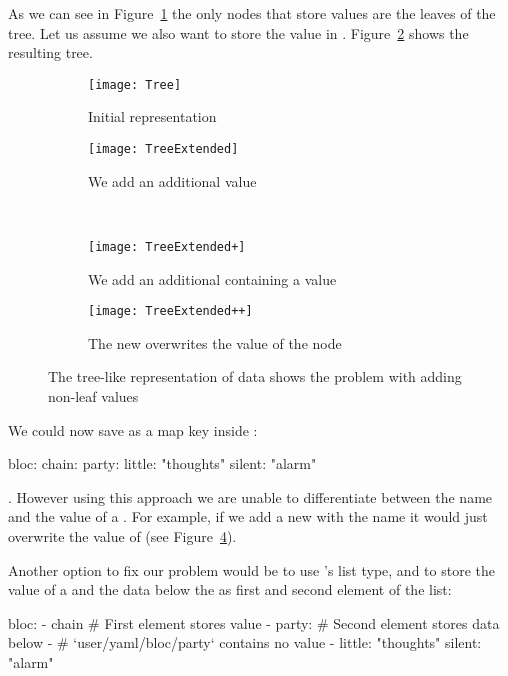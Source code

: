 As we can see in Figure~\ref{fig:tree} the only nodes that store values are the leaves of the tree. Let us assume we also want to store the value  in . Figure~\ref{fig:tree_extended} shows the resulting tree.

\begin{figure}[H]
  \centering
  \begin{subfigure}[t]{.4\textwidth}
    \centering
    \texttt{[image: Tree]}
    \caption{Initial representation}
    \label{fig:tree}
  \end{subfigure}
  \qquad
  \begin{subfigure}[t]{.4\textwidth}
    \centering
    \texttt{[image: TreeExtended]}
    \caption{We add an additional value}
    \label{fig:tree_extended}
  \end{subfigure}\\
  \begin{subfigure}[t]{.4\textwidth}
    \centering
    \texttt{[image: TreeExtended+]}
    \caption{We add an additional  containing a value}
  \end{subfigure}
  \quad
  \begin{subfigure}[t]{.4\textwidth}
    \centering
    \texttt{[image: TreeExtended++]}
    \caption{The new  overwrites the value of the node }
    \label{fig:tree_extended++}
  \end{subfigure}
  \caption{The tree-like representation of  data shows the problem with adding non-leaf values}
\end{figure}

We could now save  as a map key inside :

\begin{yamlcode}
  bloc:
    chain:
    party:
      little: "thoughts"
      silent: "alarm"
\end{yamlcode}

. However using this approach we are unable to differentiate between the name and the value of a . For example, if we add a new  with the name  it would just overwrite the value of  (see Figure~\ref{fig:tree_extended++}).

Another option to fix our problem would be to use ’s list type, and to store the value of a  and the data below the  as first and second element of the list:

\begin{yamlcode}
  bloc:
    - chain                 # First element stores value
    - party:                # Second element stores data below
      -                     # `user/yaml/bloc/party` contains no value
      - little: "thoughts"
        silent: "alarm"
\end{yamlcode}

